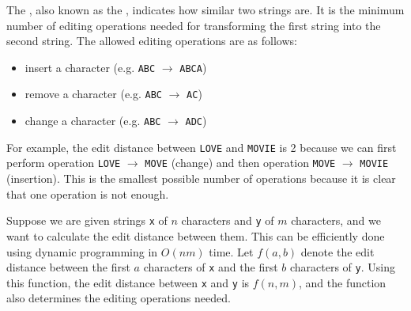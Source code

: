 The ,
also known as the ,
indicates how similar two strings are.
It is the minimum number of editing operations
needed for transforming the first string
into the second string.
The allowed editing operations are as follows:
\begin{itemize}
\item insert a character (e.g. \texttt{ABC} $\rightarrow$ \texttt{ABCA})
\item remove a character (e.g. \texttt{ABC} $\rightarrow$ \texttt{AC})
\item change a character (e.g. \texttt{ABC} $\rightarrow$ \texttt{ADC})
\end{itemize}

For example, the edit distance between
\texttt{LOVE} and \texttt{MOVIE} is 2
because we can first perform operation
 \texttt{LOVE} $\rightarrow$ \texttt{MOVE}
(change) and then operation
\texttt{MOVE} $\rightarrow$ \texttt{MOVIE}
(insertion).
This is the smallest possible number of operations
because it is clear that one operation is not enough.

Suppose we are given strings
\texttt{x} of $n$ characters and
\texttt{y} of $m$ characters,
and we want to calculate the edit distance
between them.
This can be efficiently done using
dynamic programming in $O(nm)$ time.
Let $f(a,b)$ denote the edit distance
between the first $a$ characters of \texttt{x}
and the first $b$ characters of \texttt{y}.
Using this function, the edit distance between
\texttt{x} and \texttt{y} is $f(n,m)$,
and the function also determines
the editing operations needed.

